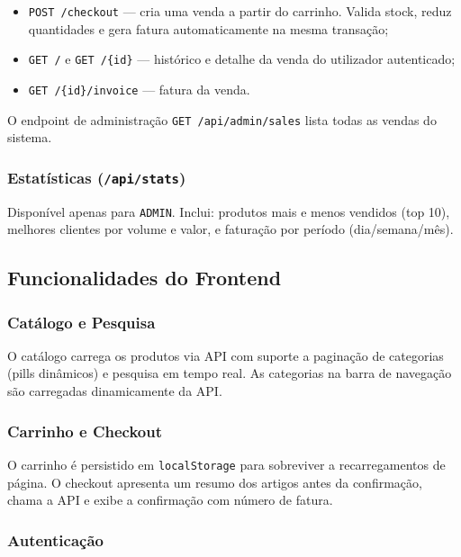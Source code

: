 \begin{itemize}
    \item \texttt{POST /checkout} — cria uma venda a partir do carrinho. Valida stock, reduz quantidades e gera fatura automaticamente na mesma transação;
    \item \texttt{GET /} e \texttt{GET /\{id\}} — histórico e detalhe da venda do utilizador autenticado;
    \item \texttt{GET /\{id\}/invoice} — fatura da venda.
\end{itemize}

O endpoint de administração \texttt{GET /api/admin/sales} lista todas as vendas do sistema.

\subsubsection{Estatísticas (\texttt{/api/stats})}

Disponível apenas para \texttt{ADMIN}. Inclui: produtos mais e menos vendidos (top 10), melhores clientes por volume e valor, e faturação por período (dia/semana/mês).

\subsection{Funcionalidades do Frontend}

\subsubsection{Catálogo e Pesquisa}

O catálogo carrega os produtos via API com suporte a paginação de categorias (pills dinâmicos) e pesquisa em tempo real. As categorias na barra de navegação são carregadas dinamicamente da API.

\subsubsection{Carrinho e Checkout}

O carrinho é persistido em \texttt{localStorage} para sobreviver a recarregamentos de página. O checkout apresenta um resumo dos artigos antes da confirmação, chama a API e exibe a confirmação com número de fatura.

\subsubsection{Autenticação}

